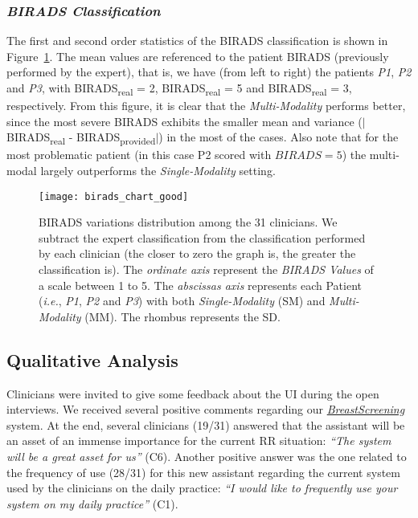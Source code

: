 \subsubsection{\textit{BIRADS Classification}}

The first and second order statistics of the BIRADS classification is shown in Figure~\ref{fig:birads_chart}.
The mean values are referenced to the patient BIRADS (previously performed by the expert), that is, we have (from left to right) the patients \textit{P1}, \textit{P2} and \textit{P3}, with BIRADS\textsubscript{real} = 2, BIRADS\textsubscript{real} = 5 and BIRADS\textsubscript{real} = 3, respectively.
From this figure, it is clear that the \textit{Multi-Modality} performs better, since the most severe BIRADS exhibits the smaller mean and variance ($|$BIRADS\textsubscript{real} - BIRADS\textsubscript{provided}$|$) in the most of the cases. Also note that for the most problematic patient (in this case P2 scored with $BIRADS=5$) the multi-modal largely outperforms the \textit{Single-Modality} setting.

\begin{figure}[ht]
\centering
\texttt{[image: birads\_chart\_good]}
\caption{\scriptsize BIRADS variations distribution among the 31 clinicians.
We subtract the expert classification from the classification performed by each clinician
(the closer to zero the graph is, the greater the classification is). The \textit{ordinate axis} represent the \textit{BIRADS Values} of a scale between 1 to 5.
The \textit{abscissas axis} represents each Patient ({\em i.e.}, \textit{P1}, \textit{P2} and \textit{P3}) with both \textit{Single-Modality} (SM) and \textit{Multi-Modality} (MM).
The rhombus represents the SD.}
\label{fig:birads_chart}
\end{figure}

\subsection{Qualitative Analysis}

Clinicians were invited to give some feedback about the UI during the open interviews.
We received several positive comments regarding our \hyperlink{https://breastscreening.github.io/}{{\it BreastScreening}} system.
At the end, several clinicians (19/31) answered that the assistant will be an asset of an immense importance for the current RR situation:
\textit{``The system will be a great asset for us''} (C6).
Another positive answer was the one related to the frequency of use (28/31) for this new assistant regarding the current system used by the clinicians on the daily practice:
\textit{``I would like to frequently use your system on my daily practice''} (C1).